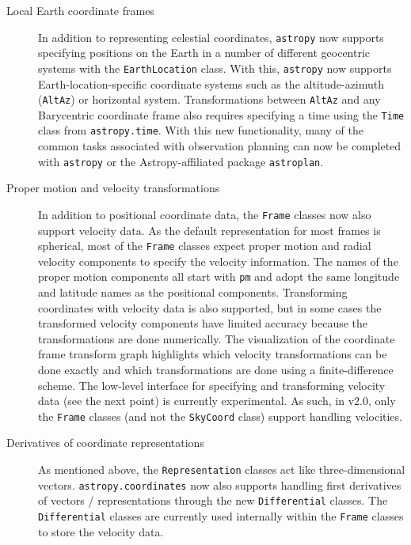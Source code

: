 \documentclass[modern]{aastex61}
\newcommand{\package}[1]{\texttt{#1}\xspace}
\newcommand{\astropy}{Astropy\xspace}
\newcommand{\astropypkg}{\package{astropy}}
\newcommand{\inlinecomment}[2]{\todo[inline]{#1: #2}\xspace}
\begin{document}
\begin{description}
    \item[Local Earth coordinate frames] In addition to representing celestial
    coordinates, \astropypkg now supports specifying positions on the Earth in
    a number of different geocentric systems with the \texttt{EarthLocation}
    class.
    With this, \astropypkg now supports Earth-location-specific coordinate
    systems such as the altitude-azimuth (\texttt{AltAz}) or horizontal system.
    Transformations between \texttt{AltAz} and any Barycentric coordinate frame
    also requires specifying a time using the \texttt{Time} class from
    \texttt{astropy.time}.
    With this new functionality, many of the common tasks associated with
    observation planning can now be completed with \astropypkg or the
    \astropy-affiliated package \package{astroplan}\citep{astroplan_AAS}.

    \item[Proper motion and velocity transformations]
    In addition to positional coordinate data, the \texttt{Frame} classes now
    also support velocity data.
    As the default representation for most frames is spherical, most of the
    \texttt{Frame} classes expect proper motion and radial velocity components
    to specify the velocity information.
    The names of the proper motion components all start with \texttt{pm} and
    adopt the same longitude and latitude names as the positional components.
    Transforming coordinates with velocity data is also supported, but in some
    cases the transformed velocity components have limited accuracy because the
    transformations are done numerically.
    The visualization of the coordinate frame transform graph highlights which
    velocity transformations can be done exactly and which transformations are
    done using a finite-difference scheme.
    The low-level interface for specifying and transforming velocity data (see
    the next point) is currently experimental.
    As such, in v2.0, only the \texttt{Frame} classes (and not the
    \texttt{SkyCoord} class) support handling velocities.

    \item[Derivatives of coordinate representations]
    As mentioned above, the \texttt{Representation} classes act like
    three-dimensional vectors.
    \texttt{astropy.coordinates} now also supports handling first derivatives of
    vectors / representations through the new \texttt{Differential} classes.
    The \texttt{Differential} classes are currently used internally within the
    \texttt{Frame} classes to store the velocity data.


\end{description}
\end{document}
